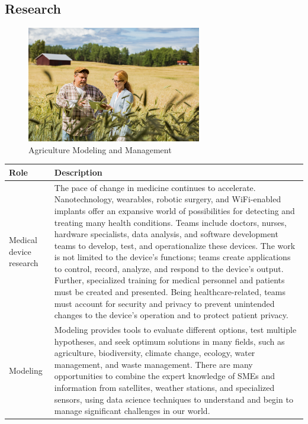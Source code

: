\subsection{Research}

\begin{figure}[H]
	\begin{center}
		\caption{Agriculture Modeling and Management}
		\vskip 4pt
		\includegraphics[height=2in]{images/careers/iStock-1272791496.small.jpg}
	\end{center}
\end{figure}

\begin{table}[H]
	\begin{center}
		\begin{tabular}{p{1in}|p{3.4in}} 
			\textbf{Role} & \textbf{Description}\\
			\hline
			Medical device research & The pace of change in medicine continues to accelerate. Nanotechnology, wearables, robotic surgery, and WiFi-enabled implants offer an expansive world of possibilities for detecting and treating many health conditions. Teams include doctors, nurses, hardware specialists, data analysis, and software development teams to develop, test, and operationalize these devices. The work is not limited to the device's functions; teams create applications to control, record, analyze, and respond to the device's output. Further, specialized training for medical personnel and patients must be created and presented. Being healthcare-related, teams must account for security and privacy to prevent unintended changes to the device's operation and to protect patient privacy.\\
			\hline
			Modeling & Modeling provides tools to evaluate different options, test multiple hypotheses, and seek optimum solutions in many fields, such as agriculture, biodiversity, climate change, ecology, water management, and waste management. There are many opportunities to combine the expert knowledge of SMEs and information from satellites, weather stations, and specialized sensors, using data science techniques to understand and begin to manage significant challenges in our world.\\
			\hline
		\end{tabular}
	\end{center}
\end{table}

